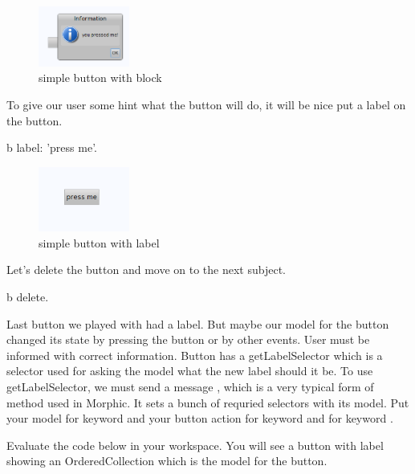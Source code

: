 \documentclass[a4paper,10pt,twoside]{book}
\begin{document}
\begin{figure}[htbp]
\begin{center}
	\includegraphics[width=3.0cm]{SimpleButtonInform}
	\caption{simple button with block}
\end{center}
\end{figure}

To give our user some hint what the button will do, it will be nice put a label on the button.

\begin{code}{}
b label: 'press me'.
\end{code}

\begin{figure}[htbp]
\begin{center}
	\includegraphics[width=3.0cm]{SimpleButtonWithLabel}
	\caption{simple button with label}
\end{center}
\end{figure}
 
Let's delete the button and move on to the next subject.

\begin{code}{}
b delete.
\end{code}

Last button we played with had a label. But maybe our model for the button changed its state by pressing the button or by other events. User must be informed with correct information. Button has a getLabelSelector which is a selector used for asking the model what the new label should it be. To use getLabelSelector, we must send a message , which is a very typical form of method used in Morphic. It sets a bunch of requried selectors with its model. Put your model for keyword  and your button action for keyword  and  for keyword .

Evaluate the code below in your workspace. You will see a button with label showing an OrderedCollection which is the model for the button.
\end{document}
